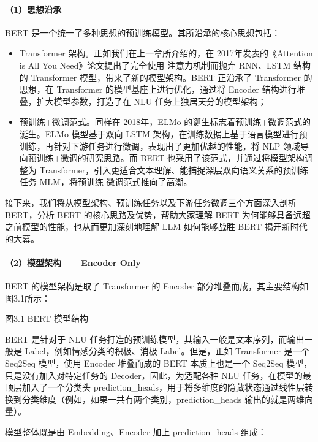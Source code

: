\documentclass[
]{article}
\providecommand{\tightlist}{%
  \setlength{\itemsep}{0pt}\setlength{\parskip}{0pt}}
\begin{document}
\paragraph{（1）思想沿承}\label{ux601dux60f3ux6cbfux627f}

BERT 是一个统一了多种思想的预训练模型。其所沿承的核心思想包括：

\begin{itemize}
\tightlist
\item
  Transformer 架构。正如我们在上一章所介绍的，在 2017年发表的《Attention
  is All You Need》论文提出了完全使用 注意力机制而抛弃 RNN、LSTM 结构的
  Transformer 模型，带来了新的模型架构。BERT 正沿承了 Transformer
  的思想，在 Transformer 的模型基座上进行优化，通过将 Encoder
  结构进行堆叠，扩大模型参数，打造了在 NLU 任务上独居天分的模型架构；
\item
  预训练+微调范式。同样在 2018年，ELMo
  的诞生标志着预训练+微调范式的诞生。ELMo 模型基于双向 LSTM
  架构，在训练数据上基于语言模型进行预训练，再针对下游任务进行微调，表现出了更加优越的性能，将
  NLP 领域导向预训练+微调的研究思路。而 BERT
  也采用了该范式，并通过将模型架构调整为
  Transformer，引入更适合文本理解、能捕捉深层双向语义关系的预训练任务
  MLM，将预训练-微调范式推向了高潮。
\end{itemize}

接下来，我们将从模型架构、预训练任务以及下游任务微调三个方面深入剖析
BERT，分析 BERT 的核心思路及优势，帮助大家理解 BERT
为何能够具备远超之前模型的性能，也从而更加深刻地理解 LLM 如何能够战胜
BERT 揭开新时代的大幕。

\paragraph{（2）模型架构------Encoder
Only}\label{ux6a21ux578bux67b6ux6784encoder-only}

BERT 的模型架构是取了 Transformer 的 Encoder
部分堆叠而成，其主要结构如图3.1所示：

图3.1 BERT 模型结构

BERT 是针对于 NLU
任务打造的预训练模型，其输入一般是文本序列，而输出一般是
Label，例如情感分类的积极、消极 Label。但是，正如 Transformer 是一个
Seq2Seq 模型，使用 Encoder 堆叠而成的 BERT 本质上也是一个 Seq2Seq
模型，只是没有加入对特定任务的 Decoder，因此，为适配各种 NLU
任务，在模型的最顶层加入了一个分类头
prediction\_heads，用于将多维度的隐藏状态通过线性层转换到分类维度（例如，如果一共有两个类别，prediction\_heads
输出的就是两维向量）。

模型整体既是由 Embedding、Encoder 加上 prediction\_heads 组成：
\end{document}
